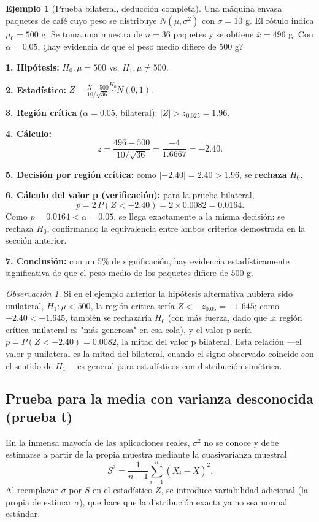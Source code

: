 \documentclass[11pt,a4paper]{article}
\theoremstyle{plain}
\theoremstyle{definition}
\newtheorem{ejemplo}[teorema]{Ejemplo}
\theoremstyle{remark}
\newtheorem{observacion}[teorema]{Observación}
\begin{document}
\begin{ejemplo}[Prueba bilateral, deducción completa]
Una máquina envasa paquetes de café cuyo peso se distribuye $N(\mu,\sigma^2)$ con $\sigma=10$ g. El rótulo indica $\mu_0=500$ g. Se toma una muestra de $n=36$ paquetes y se obtiene $\overline x=496$ g. Con $\alpha=0.05$, ¿hay evidencia de que el peso medio difiere de $500$ g?

\textbf{1. Hipótesis:} $H_0:\mu=500$ vs. $H_1:\mu\neq500$.

\textbf{2. Estadístico:} $\displaystyle Z=\frac{\overline X-500}{10/\sqrt{36}}\overset{H_0}{\sim}N(0,1)$.

\textbf{3. Región crítica} ($\alpha=0.05$, bilateral): $|Z|>z_{0.025}=1.96$.

\textbf{4. Cálculo:}
\[
z=\frac{496-500}{10/\sqrt{36}}=\frac{-4}{1.6667}=-2.40.
\]

\textbf{5. Decisión por región crítica:} como $|-2.40|=2.40>1.96$, se \textbf{rechaza} $H_0$.

\textbf{6. Cálculo del valor p (verificación):} para la prueba bilateral,
\[
p=2\,P(Z<-2.40)=2\times0.0082=0.0164.
\]
Como $p=0.0164<\alpha=0.05$, se llega exactamente a la misma decisión: se rechaza $H_0$, confirmando la equivalencia entre ambos criterios demostrada en la sección anterior.

\textbf{7. Conclusión:} con un $5\%$ de significación, hay evidencia estadísticamente significativa de que el peso medio de los paquetes difiere de $500$ g.
\end{ejemplo}

\begin{observacion}
Si en el ejemplo anterior la hipótesis alternativa hubiera sido unilateral, $H_1:\mu<500$, la región crítica sería $Z<-z_{0.05}=-1.645$; como $-2.40<-1.645$, también se rechazaría $H_0$ (con más fuerza, dado que la región crítica unilateral es "más generosa" en esa cola), y el valor p sería $p=P(Z<-2.40)=0.0082$, la mitad del valor p bilateral. Esta relación —el valor p unilateral es la mitad del bilateral, cuando el signo observado coincide con el sentido de $H_1$— es general para estadísticos con distribución simétrica.
\end{observacion}

\subsection{Prueba para la media con varianza desconocida (prueba t)}

En la inmensa mayoría de las aplicaciones reales, $\sigma^2$ no se conoce y debe estimarse a partir de la propia muestra mediante la cuasivarianza muestral
\[
S^2=\frac{1}{n-1}\sum_{i=1}^n (X_i-\overline X)^2.
\]
Al reemplazar $\sigma$ por $S$ en el estadístico $Z$, se introduce variabilidad adicional (la propia de estimar $\sigma$), que hace que la distribución exacta ya no sea normal estándar.
\end{document}
